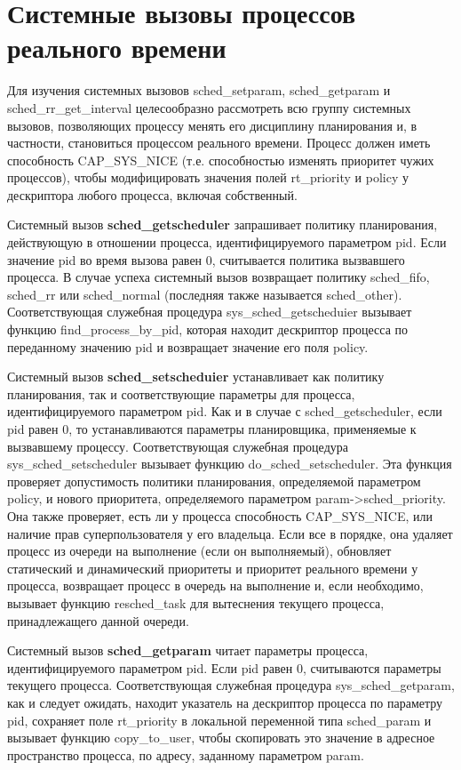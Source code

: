 \newpage
\section{Системные вызовы процессов реального времени}

Для изучения системных вызовов sched\_setparam, sched\_getparam и sched\_rr\_get\_interval целесообразно рассмотреть всю группу системных вызовов, позволяющих процессу менять его дисциплину планирования и, в частности, становиться процессом реального времени. Процесс должен иметь способность CAP\_SYS\_NICE (т.е. способностью изменять приоритет чужих процессов), чтобы модифицировать значения полей rt\_priority и policy у дескриптора любого процесса, включая собственный.

Системный вызов \textbf{sched\_getscheduler} запрашивает политику планирования, действующую в отношении процесса, идентифицируемого параметром pid. Если значение pid во время вызова равен 0, считывается политика вызвавшего процесса. В случае успеха системный вызов возвращает политику sched\_fifo, sched\_rr или sched\_normal (последняя также называется sched\_other). Соответствующая служебная процедура sys\_sched\_getscheduier вызывает функцию find\_process\_by\_pid, которая находит дескриптор процесса по переданному значению pid и возвращает значение его поля policy.

Системный вызов \textbf{sched\_setscheduier} устанавливает как политику планирования, так и соответствующие параметры для процесса, идентифицируемого параметром pid. Как и в случае с sched\_getscheduler, если pid равен 0, то устанавливаются параметры планировщика, применяемые к вызвавшему процессу. Соответствующая служебная процедура sys\_sched\_setscheduler вызывает функцию do\_sched\_setscheduler. Эта функция проверяет допустимость политики планирования, определяемой параметром policy, и нового приоритета, определяемого параметром param->sched\_priority. Она также проверяет, есть ли у процесса способность CAP\_SYS\_NICE, или наличие прав суперпользователя у его владельца. Если все в порядке, она удаляет процесс из очереди на выполнение (если он выполняемый), обновляет статический и динамический приоритеты и приоритет реального времени у процесса, возвращает процесс в очередь на выполнение и, если необходимо, вызывает функцию resched\_task для вытеснения текущего процесса, принадлежащего данной очереди.

Системный вызов \textbf{sched\_getparam} читает параметры процесса, идентифицируемого параметром pid. Если pid равен 0, считываются параметры текущего процесса. Соответствующая служебная процедура sys\_sched\_getparam, как и следует ожидать, находит указатель на дескриптор процесса по параметру
pid, сохраняет поле rt\_priority в локальной переменной типа sched\_param и вызывает функцию copy\_to\_user, чтобы скопировать это значение в адресное пространство процесса, по адресу, заданному параметром param.

